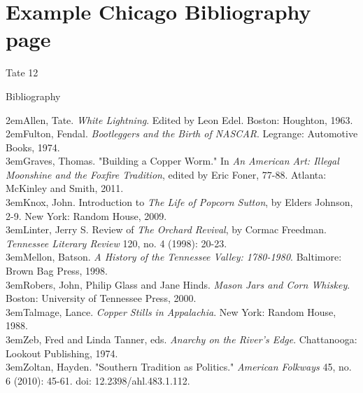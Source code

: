 \newpage \section{Example Chicago Bibliography page} 
\begin{tcolorbox}[enhanced,width=4.2in,left=.3in, right=.3in,
   drop fuzzy shadow southeast,
    boxrule=0.4pt,sharp corners,colframe=black!80!black,colback=white!10]

\medskip

{\scriptsize \begin{flushright} Tate 12 \end{flushright}
\begin{singlespacing}

\begin{center}Bibliography \end{center}

\hangindent2em{Allen, Tate. \emph{White Lightning}. Edited by Leon Edel. Boston: Houghton, 1963.}\\

\hangindent2em{Fulton, Fendal. \emph{Bootleggers and the Birth of NASCAR}. Legrange: Automotive Books, 1974.}\\

\hangindent3em{Graves, Thomas. "Building a Copper Worm." In \emph{An American Art: Illegal Moonshine and the Foxfire Tradition}, edited by Eric Foner, 77-88. Atlanta: McKinley and Smith, 2011.}\\

\hangindent3em{Knox, John. Introduction to \emph{The Life of Popcorn Sutton}, by Elders Johnson, 2-9. New York: Random House, 2009.}\\

\hangindent3em{Linter, Jerry S. Review of \emph{The Orchard Revival}, by Cormac Freedman. \emph{Tennessee
Literary Review} 120, no. 4 (1998): 20-23.}\\

\hangindent3em{Mellon, Batson. \emph{A History of the Tennessee Valley: 1780-1980}. Baltimore: Brown Bag Press, 1998.}\\

\hangindent3em{Robers, John, Philip Glass and Jane Hinds. \emph{Mason Jars and Corn Whiskey}. Boston: University of Tennessee Press, 2000.}\\

\hangindent3em{Talmage, Lance. \emph{Copper Stills in Appalachia}. New York: Random House, 1988.}\\

\hangindent3em{Zeb, Fred and Linda Tanner, eds. \emph{Anarchy on the River's Edge}. Chattanooga: Lookout Publishing, 1974.}\\

\hangindent3em{Zoltan, Hayden. "Southern Tradition as Politics." \emph{American Folkways} 45, no. 6 (2010): 45-61. doi: 12.2398/ahl.483.1.112.}\\


\end{singlespacing}}
\vspace{3.2cm}

\end{tcolorbox}

